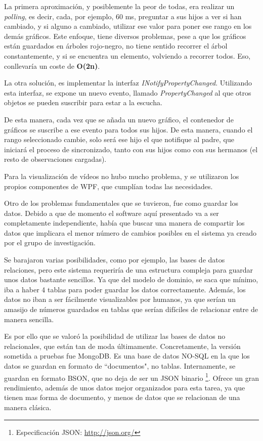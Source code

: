 La primera aproximaci\'on, y posiblemente la peor de todas, era realizar un \emph{polling}, es decir, cada, por ejemplo, 60 ms,
preguntar a sus hijos a ver si han cambiado, y si alguno a cambiado, utilizar ese valor para poner ese rango en los dem\'as 
gr\'aficos. Este enfoque, tiene diversos problemas, pese a que los gr\'aficos est\'an guardados en \'arboles rojo-negro,
no tiene sentido recorrer el \'arbol constantemente, y si se encuentra un elemento, volviendo a recorrer todos. Eso,
conllevar\'ia un coste de \textbf{O(2n)}.

La otra soluci\'on, es implementar la interfaz \emph{INotifyPropertyChanged}. Utilizando esta interfaz, se expone un 
nuevo evento, llamado \emph{PropertyChanged} al que otros objetos se pueden suscribir para estar a la escucha.

De esta manera, cada vez que se a\~nada un nuevo gr\'afico, el contenedor de gr\'aficos se suscribe a ese evento para todos
sus hijos. De esta manera, cuando el rango seleccionado cambie, solo ser\'a ese hijo el que notifique al padre, que iniciar\'a
el proceso de sincronizado, tanto con sus hijos como con sus hermanos (el resto de observaciones cargadas).

Para la visualizaci\'on de v\'ideos no hubo mucho problema, y se utilizaron los
propios componentes de WPF, que cumpl\'ian todas las necesidades.

Otro de los problemas fundamentales que se tuvieron, fue como guardar los datos. Debido a que de momento el software
aqu\'i presentado va a ser completamente independiente, hab\'ia que buscar una manera de compartir los datos
que implicara el menor n\'umero de cambios posibles en el sistema ya creado por el grupo de investigaci\'on.

Se barajaron varias posibilidades, como por ejemplo, las bases de datos relaciones, pero este sistema requerir\'ia
de una estructura compleja para guardar unos datos bastante sencillos. Ya que del modelo de dominio, se saca que m\'inimo,
iba a haber 4 tablas para poder guardar los datos correctamente. Adem\'as, los datos no iban a ser f\'acilmente 
visualizables por humanos, ya que ser\'ian un amasijo de n\'umeros guardados en tablas que ser\'ian dif\'iciles de
relacionar entre de manera sencilla.

Es por ello que se valor\'o la posibilidad de utilizar las bases de datos no relacionales, que est\'an tan de moda
\'ultimamente. Concretamente, la versi\'on sometida a pruebas fue MongoDB. Es una base de datos NO-SQL en la que los
datos se guardan en formato de ``documentos", no tablas. Internamente, se guardan en formato BSON, que no deja de ser
un JSON binario \footnote{Especificaci\'{o}n JSON: \url{http://json.org/}}. Ofrece un gran rendimiento, adem\'as
de unos datos mejor organizados para esta tarea, ya que tienen mas forma de documento, y menos de datos que se
relacionan de una manera cl\'asica. 


